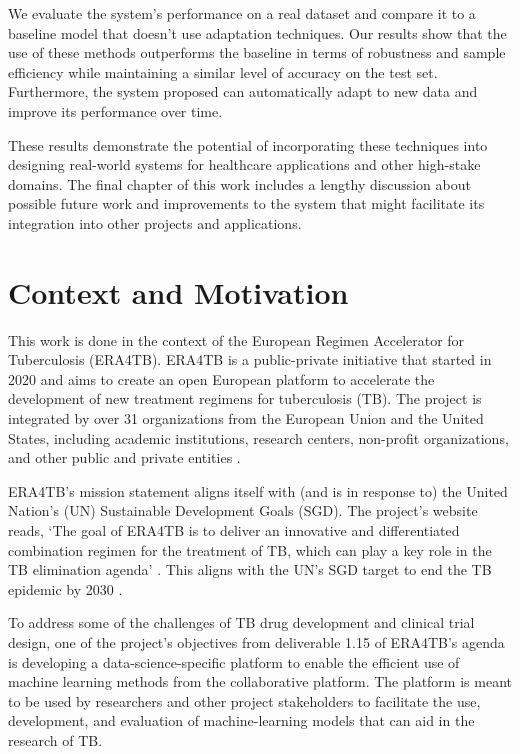 \documentclass[../main.tex]{subfiles}
\begin{document}
 We evaluate the system's performance on a real dataset and compare it to a baseline model that doesn't use adaptation techniques.  Our results show that the use of these methods outperforms the baseline in terms of robustness and sample efficiency while maintaining a similar level of accuracy on the test set. Furthermore, the system proposed can automatically adapt to new data and improve its performance over time. 
 
 These results demonstrate the potential of incorporating these techniques into designing real-world systems for healthcare applications and other high-stake domains. The final chapter of this work includes a lengthy discussion about possible future work and improvements to the system that might facilitate its integration into other projects and applications.
    
 \section{Context and Motivation} \label{sec:motivation}

    This work is done in the context of the European Regimen Accelerator for Tuberculosis (ERA4TB). ERA4TB is a public-private initiative that started in 2020 and aims to create an open European platform to accelerate the development of new treatment regimens for tuberculosis (TB). The project is integrated by over 31 organizations from the European Union and the United States, including academic institutions, research centers, non-profit organizations, and other public and private entities \cite{noauthor_era4tb}.
    
    ERA4TB's mission statement aligns itself with (and is in response to) the United Nation's (UN) Sustainable Development Goals (SGD). The project's website reads, `The goal of ERA4TB is to deliver an innovative and differentiated combination regimen for the treatment of TB, which can play a key role in the TB elimination agenda' \cite{noauthor_era4tb}. This aligns with the UN's SGD target to end the TB epidemic by 2030 \cite{world_health_organization_regional_office_for_europe_tuberculosis_2017}.

    To address some of the challenges of TB drug development and clinical trial design, one of the project's objectives from deliverable 1.15 of ERA4TB's agenda is developing a data-science-specific platform to enable the efficient use of machine learning methods from the collaborative platform. The platform is meant to be used by researchers and other project stakeholders to facilitate the use, development, and evaluation of machine-learning models that can aid in the research of TB.
\end{document}

